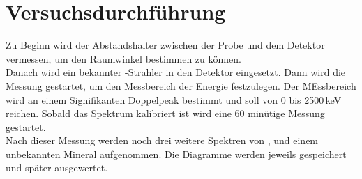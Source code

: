 \section{Versuchsdurchführung}
Zu Beginn wird der Abstandshalter zwischen der Probe und dem Detektor vermessen, um den Raumwinkel bestimmen zu können. \\
Danach wird ein bekannter -Strahler in den Detektor eingesetzt. Dann wird die Messung gestartet, um den Messbereich der Energie festzulegen. Der MEssbereich wird an einem Signifikanten Doppelpeak bestimmt und soll von 0 bis 2500\,keV reichen. Sobald das Spektrum kalibriert ist wird eine 60 minütige Messung gestartet. \\
Nach dieser Messung werden noch drei weitere Spektren von ,  und einem unbekannten Mineral aufgenommen. Die Diagramme werden jeweils gespeichert und später ausgewertet.
